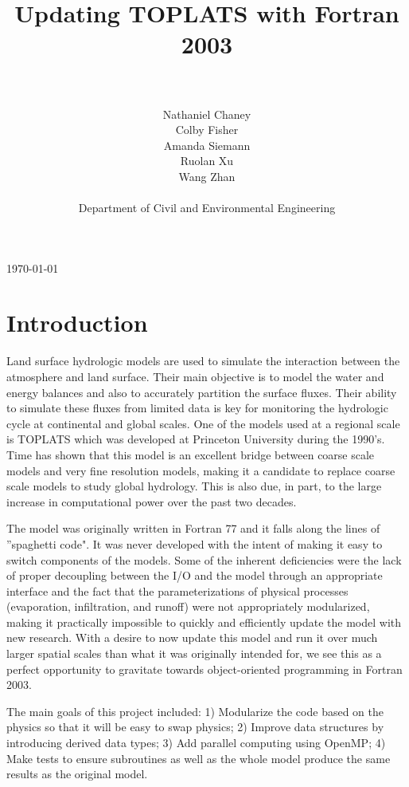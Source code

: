 \documentclass[pdftex,12pt,a4paper]{article}
\title{Updating TOPLATS with Fortran 2003}
\author{\\ \\ Nathaniel Chaney\\ Colby Fisher\\ Amanda Siemann\\ Ruolan Xu\\ Wang Zhan \\ \\ Department of Civil and Environmental Engineering}
\date{}
\begin{document}
\maketitle
\vfill
\begin{center}
{\large \today}
\end{center}

\section{Introduction}
Land surface hydrologic models are used to simulate the interaction between the atmosphere and land surface. Their main objective is to model the water and energy balances and also to accurately partition the surface fluxes. Their ability to simulate these fluxes from limited data is key for monitoring the hydrologic cycle at continental and global scales. One of the models used at a regional scale is TOPLATS which was developed at Princeton University during the 1990's. Time has shown that this model is an excellent bridge between coarse scale models and very fine resolution models, making it a candidate to replace coarse scale models to study global hydrology. This is also due, in part, to the large increase in computational power over the past two decades. 

The model was originally written in Fortran 77 and it falls along the lines of ''spaghetti code". It was never developed with the intent of making it easy to switch components of the models. Some of the inherent deficiencies were the lack of proper decoupling between the I/O and the model through an appropriate interface and the fact that the parameterizations of physical processes (evaporation, infiltration, and runoff) were not appropriately modularized, making it practically impossible to quickly and efficiently update the model with new research. With a desire to now update this model and run it over much larger spatial scales than what it was originally intended for, we see this as a perfect opportunity to gravitate towards object-oriented programming in Fortran 2003. 

The main goals of this project included: 1) Modularize the code based on the physics so that it will be easy to swap physics; 2) Improve data structures by introducing derived data types; 3) Add parallel computing using OpenMP; 4) Make tests to ensure subroutines as well as the whole model produce the same results as the original model. 

\newpage
\end{document}

